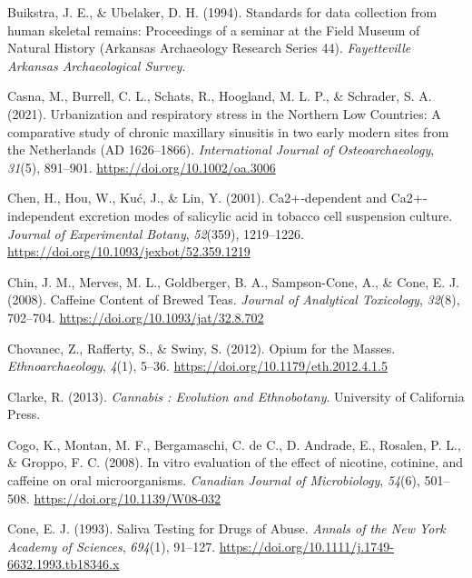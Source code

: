 \documentclass[
  letterpaper,
]{book}
\newlength{\cslhangindent}
\newlength{\cslentryspacingunit} %
\newenvironment{CSLReferences}[2] %
 {%
  \setlength{\parindent}{0pt}
  \ifodd #1
  \let\oldpar\par
  \def\par{\hangindent=\cslhangindent\oldpar}
  \fi
  \setlength{\parskip}{#2\cslentryspacingunit}
 }%
 {}
\begin{document}
\begin{CSLReferences}{1}{0}
\leavevmode{}%
Buikstra, J. E., \& Ubelaker, D. H. (1994). Standards for data
collection from human skeletal remains: {Proceedings} of a seminar at
the {Field Museum} of {Natural History} ({Arkansas Archaeology Research
Series} 44). \emph{Fayetteville Arkansas Archaeological Survey}.

\leavevmode{}%
Casna, M., Burrell, C. L., Schats, R., Hoogland, M. L. P., \& Schrader,
S. A. (2021). Urbanization and respiratory stress in the {Northern Low
Countries}: {A} comparative study of chronic maxillary sinusitis in two
early modern sites from the {Netherlands} ({AD} 1626--1866).
\emph{International Journal of Osteoarchaeology}, \emph{31}(5),
891--901. \url{https://doi.org/10.1002/oa.3006}

\leavevmode{}%
Chen, H., Hou, W., Kuć, J., \& Lin, Y. (2001). Ca2+‐dependent and
{Ca2}+‐independent excretion modes of salicylic acid in tobacco cell
suspension culture. \emph{Journal of Experimental Botany},
\emph{52}(359), 1219--1226.
\url{https://doi.org/10.1093/jexbot/52.359.1219}

\leavevmode{}%
Chin, J. M., Merves, M. L., Goldberger, B. A., Sampson-Cone, A., \&
Cone, E. J. (2008). Caffeine {Content} of {Brewed Teas}. \emph{Journal
of Analytical Toxicology}, \emph{32}(8), 702--704.
\url{https://doi.org/10.1093/jat/32.8.702}

\leavevmode{}%
Chovanec, Z., Rafferty, S., \& Swiny, S. (2012). Opium for the {Masses}.
\emph{Ethnoarchaeology}, \emph{4}(1), 5--36.
\url{https://doi.org/10.1179/eth.2012.4.1.5}

\leavevmode{}%
Clarke, R. (2013). \emph{Cannabis : {Evolution} and {Ethnobotany}}.
{University of California Press}.

\leavevmode{}%
Cogo, K., Montan, M. F., Bergamaschi, C. de C., D. Andrade, E., Rosalen,
P. L., \& Groppo, F. C. (2008). In vitro evaluation of the effect of
nicotine, cotinine, and caffeine on oral microorganisms. \emph{Canadian
Journal of Microbiology}, \emph{54}(6), 501--508.
\url{https://doi.org/10.1139/W08-032}

\leavevmode{}%
Cone, E. J. (1993). Saliva {Testing} for {Drugs} of {Abuse}.
\emph{Annals of the New York Academy of Sciences}, \emph{694}(1),
91--127. \url{https://doi.org/10.1111/j.1749-6632.1993.tb18346.x}


\end{CSLReferences}
\end{document}
